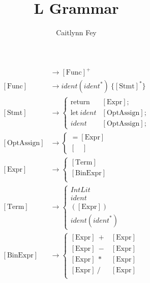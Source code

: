 \documentclass{article}
\title{L Grammar}
\author{Caitlynn Fey}
\begin{document}
	\maketitle
	\begin{align*} 
		[\text{Prog}] &\to  [\text{Func}]^+ \\
		[\text{Func}] &\to \textit{ident}(\textit{ident}^*)\ \{[\text{Stmt}]^*\} \\
		[\text{Stmt}] &\to  
		\begin{cases}
			\text{return} \ &[\text{Expr}]; \\
			\text{let} \ \textit{ident} &[\text{OptAssign}]; \\
			\textit{ident} &[\text{OptAssign}];
		\end{cases} \\
		[\text{OptAssign}] &\to
		\begin{cases}
			= [\text{Expr}]\\
			[\quad]
		\end{cases} \\
		[\text{Expr}]	&\to 
		\begin{cases}
			[\text{Term}] \\
			[\text{BinExpr}] \\
		\end{cases} \\	
		[\text{Term}]	&\to 
		\begin{cases}
			\textit{IntLit} \\
			\textit{ident} \\
			([\text{Expr}]) \\
			\textit{ident}(\textit{ident}^*)
		\end{cases} \\	
		[\text{BinExpr}]	&\to 
		\begin{cases}
			[\text{Expr}]\ + &[\text{Expr}] \\
			[\text{Expr}]\ - &[\text{Expr}] \\
			[\text{Expr}]\ * &[\text{Expr}] \\
			[\text{Expr}]\ / &[\text{Expr}] \\
		\end{cases}
	\end{align*}
\end{document}
